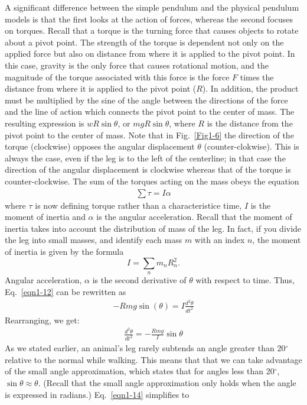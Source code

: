 A significant difference between the simple pendulum and the physical pendulum models is that the first looks at the action of forces, whereas the second focuses on torques. Recall that a torque is the turning force that causes objects to rotate about a pivot point. The strength of the torque is dependent not only on the applied force but also on distance from where it is applied to the pivot point. In this case, gravity is the only force that causes rotational motion, and the magnitude of the torque associated with this force is the force $F$ times the distance from where it is applied to the pivot point ($R$). In addition, the product must be multiplied by the sine of the angle between the directions of the force and the line of action which connects the pivot point to the center of mass. The resulting expression is $w R \sin\theta$, or $m g R \sin\theta$, where $R$ is the distance from the pivot point to the center of mass.  Note that in Fig.~\ref{Fig1-6} the direction of the torque (clockwise) opposes the angular displacement $\theta$ (counter-clokwise). This is always the case, even if the leg is to the left of the centerline; in that case the direction of the angular displacement is clockwise whereas that of the torque is counter-clockwise. 
The sum of the torques acting on the mass obeys the equation
\begin{eqnarray}\label{eqn1-12}
\sum \tau = I\alpha
\end{eqnarray}
where $\tau$ is now defining torque rather than a characteristice time, $I$ is the moment of inertia and $\alpha$ is the angular acceleration.  Recall that the moment of inertia takes into account the distribution of mass of the leg.  In fact, if you divide the leg into small masses, and identify each mass $m$ with an index $n$, the moment of inertia is given by the formula  $$I=\sum_n m_n R_n^2.$$  
Angular acceleration, $\alpha$ is the second derivative of $\theta$ with respect to time.  Thus, Eq.~\ref{eqn1-12} can be rewritten as
\begin{eqnarray}\label{eqn1-13}
-R m g \sin\left(\theta\right)=I\frac{d^2\theta}{dt^2}
\end{eqnarray}
Rearranging, we get:
\begin{eqnarray}\label{eqn1-14}
\frac{d^2\theta}{dt^2} = -\frac{Rmg}{I}\sin\theta
\end{eqnarray}
As we stated earlier, an animal’s leg rarely subtends an angle greater than 20$^{\circ}$ relative to the normal while walking.  This means that that we can take advantage of the small angle approximation, which states that for angles less than 20$^{\circ}$, $\sin\theta \approx \theta$.  (Recall that the small angle approximation only holds when the angle is expressed in radians.)  Eq.~\ref{eqn1-14} simplifies to
